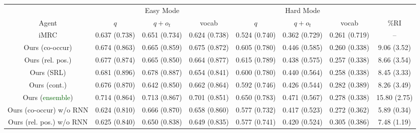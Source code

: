\documentclass[11pt]{article}
\newcommand{\imrc}{iMRC\xspace}
\begin{document}
\begin{table*}%
    \centering
    \scriptsize
    \begin{tabular}{c|ccc|ccc|c}
        \toprule
        & \multicolumn{3}{c|}{Easy Mode} & \multicolumn{3}{c|}{Hard Mode} &  \\
        Agent & $q$ & $q + o_t$ & vocab & $q$ & $q + o_t$ & vocab & \%RI\\
        \midrule %
        \imrc \citep{yuan2020imrc}      & 0.637 \color{blue}(0.738) & 0.651 \color{blue}(0.734) & 0.624 \color{blue}(0.738) & 0.524 \color{blue}(0.740) & 0.362 \color{blue}(0.729) & 0.261 \color{blue}(0.719) & -- \\
        \midrule
        Ours (co-occur)                         & 0.674 \color{blue}(0.863) & 0.665 \color{blue}(0.859) & 0.675 \color{blue}(0.872) & 0.605 \color{blue}(0.780) & 0.446 \color{blue}(0.585) & 0.260 \color{blue}(0.338) & 9.06 \color{blue}(3.52) \\
        Ours (rel. pos.)                        & 0.677 \color{blue}(0.874) & 0.665 \color{blue}(0.850) & 0.664 \color{blue}(0.877) & 0.615 \color{blue}(0.789) & 0.438 \color{blue}(0.575) & 0.257 \color{blue}(0.338) & 8.66 \color{blue}(3.54) \\
        Ours (SRL)                              & 0.681 \color{blue}(0.896) & 0.678 \color{blue}(0.887) & 0.654 \color{blue}(0.841) & 0.600 \color{blue}(0.780) & 0.440 \color{blue}(0.564) & 0.258 \color{blue}(0.338) & 8.45 \color{blue}(3.33) \\
        Ours (cont.)                            & 0.676 \color{blue}(0.870) & 0.642 \color{blue}(0.850) & 0.662 \color{blue}(0.864) & 0.592 \color{blue}(0.746) & 0.426 \color{blue}(0.544) & 0.282 \color{blue}(0.389) & 8.26 \color{blue}(3.49) \\
        Ours (\textcolor{darkgreen}{ensemble})  & 0.714 \color{blue}(0.864) & 0.713 \color{blue}(0.867) & 0.701 \color{blue}(0.851) & 0.650 \color{blue}(0.783) & 0.471 \color{blue}(0.567) & 0.278 \color{blue}(0.338) & 15.80 \color{blue}(2.75) \\
        \midrule
        Ours (co-occur) w/o RNN                         & 0.624 \color{blue}(0.810) & 0.666 \color{blue}(0.870) & 0.658 \color{blue}(0.860) & 0.577 \color{blue}(0.732) & 0.417 \color{blue}(0.523) & 0.272 \color{blue}(0.362) & 5.89 \color{blue}(0.34) \\
        Ours (rel. pos.) w/o RNN                        & 0.625 \color{blue}(0.840) & 0.650 \color{blue}(0.838) & 0.649 \color{blue}(0.835) & 0.577 \color{blue}(0.741) & 0.420 \color{blue}(0.524) & 0.305 \color{blue}(0.386) & 7.48 \color{blue}(1.19) \\

\end{tabular}
\end{table*}
\end{document}
